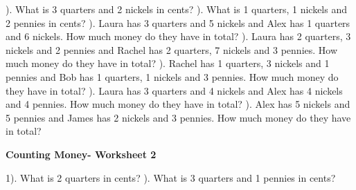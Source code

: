 \documentclass{article}%
\begin{document}
\newline%
\newline%
). What is 3 quarters and 2 nickels in cents?%
\newline%
\newline%
). What is 1 quarters, 1 nickels and 2 pennies in cents?%
\newline%
\newline%
). Laura has 3 quarters and 5 nickels and Alex has 1 quarters and 6 nickels. How much money do they have in total?%
\newline%
\newline%
). Laura has 2 quarters, 3 nickels and 2 pennies and Rachel has 2 quarters, 7 nickels and 3 pennies. How much money do they have in total?%
\newline%
\newline%
). Rachel has 1 quarters, 3 nickels and 1 pennies and Bob has 1 quarters, 1 nickels and 3 pennies. How much money do they have in total?%
\newline%
\newline%
). Laura has 3 quarters and 4 nickels and Alex has 4 nickels and 4 pennies. How much money do they have in total?%
\newline%
\newline%
). Alex has 5 nickels and 5 pennies and James has 2 nickels and 3 pennies. How much money do they have in total?%
\newline%
\newline%
\newline%
\pagebreak%
\large%
\begin{center}%
\textbf{Counting Money- Worksheet 2}%
\newline%
\newline%
\newline%
\end{center} \normalsize%
1). What is 2 quarters in cents?%
\newline%
\newline%
). What is 3 quarters and 1 pennies in cents?%
\newline%
\newline%
\end{document}

